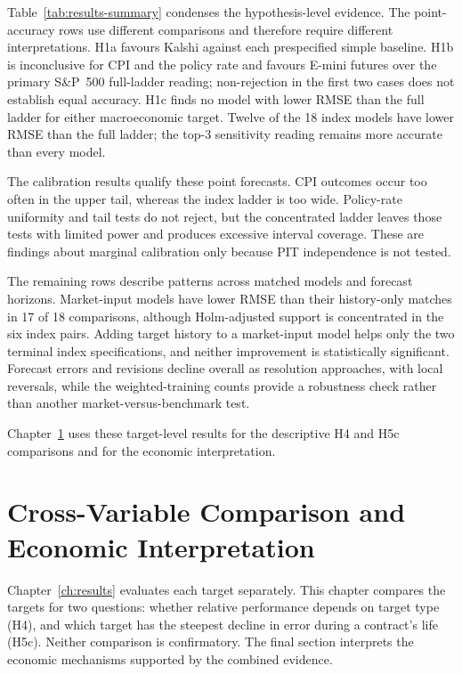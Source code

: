 \documentclass[12pt,a4paper]{report}
\begin{document}
Table~\ref{tab:results-summary} condenses the hypothesis-level evidence. The
point-accuracy rows use different comparisons and therefore require different
interpretations. H1a favours Kalshi against each prespecified simple baseline.
H1b is inconclusive for CPI and the policy rate and favours E-mini futures over
the primary S\&P~500 full-ladder reading; non-rejection in the first two cases
does not establish equal accuracy. H1c finds no model with lower RMSE than the
full ladder for either macroeconomic target. Twelve of the 18 index models have
lower RMSE than the full ladder; the top-3 sensitivity reading remains more
accurate than every model.

The calibration results qualify these point forecasts. CPI outcomes occur too
often in the upper tail, whereas the index ladder is too wide. Policy-rate
uniformity and tail tests do not reject, but the concentrated ladder leaves
those tests with limited power and produces excessive interval coverage. These
are findings about marginal calibration only because PIT independence is not
tested.

The remaining rows describe patterns across matched models and forecast
horizons. Market-input models have lower RMSE than their history-only matches in
17 of 18 comparisons, although Holm-adjusted support is concentrated in the six
index pairs. Adding target history to a market-input model helps only the two
terminal index specifications, and neither improvement is statistically
significant. Forecast errors and revisions decline overall as resolution
approaches, with local reversals, while the weighted-training counts provide a
robustness check rather than another market-versus-benchmark test.

Chapter~\ref{ch:interpretation} uses these target-level results for the
descriptive H4 and H5c comparisons and for the economic interpretation.

\chapter{Cross-Variable Comparison and Economic Interpretation}
\label{ch:interpretation}

Chapter~\ref{ch:results} evaluates each target separately. This chapter compares
the targets for two questions: whether relative performance depends on target
type (H4), and which target has the steepest decline in error during a
contract's life (H5c). Neither comparison is confirmatory. The final section
interprets the economic mechanisms supported by the combined evidence.
\end{document}

